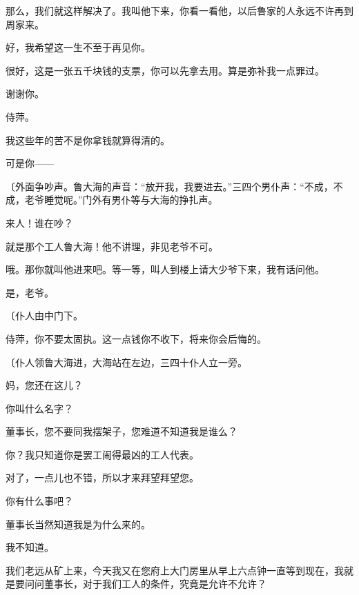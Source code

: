 那么，我们就这样解决了。我叫他下来，你看一看他，以后鲁家的人永远不许再到周家来。

好，我希望这一生不至于再见你。

很好，这是一张五千块钱的支票，你可以先拿去用。算是弥补我一点罪过。

谢谢你。

侍萍。

我这些年的苦不是你拿钱就算得清的。

可是你——

{\fangsong〔外面争吵声。鲁大海的声音：“放开我，我要进去。”三四个男仆声：“不成，不成，老爷睡觉呢。”门外有男仆等与大海的挣扎声。}

来人！谁在吵？

就是那个工人鲁大海！他不讲理，非见老爷不可。

哦。那你就叫他进来吧。等一等，叫人到楼上请大少爷下来，我有话问他。

是，老爷。

{\fangsong〔仆人由中门下。}

侍萍，你不要太固执。这一点钱你不收下，将来你会后悔的。


{\fangsong〔仆人领鲁大海进，大海站在左边，三四十仆人立一旁。}

妈，您还在这儿？

你叫什么名字？

董事长，您不要同我摆架子，您难道不知道我是谁么？

你？我只知道你是罢工闹得最凶的工人代表。

对了，一点儿也不错，所以才来拜望拜望您。

你有什么事吧？

董事长当然知道我是为什么来的。

我不知道。

我们老远从矿上来，今天我又在您府上大门房里从早上六点钟一直等到现在，我就是要问问董事长，对于我们工人的条件，究竟是允许不允许？

